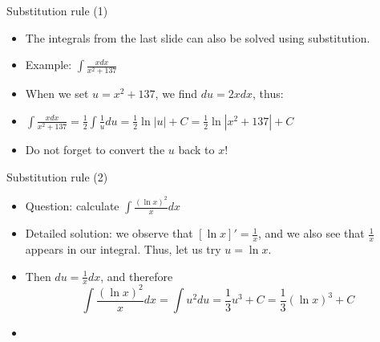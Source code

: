 \begin{frame}{Substitution rule (1)}
    \begin{itemize}
        \item The integrals from the last slide can also be solved using substitution.
        \item Example: $\int\frac{xdx}{x^2+137}$
        \pause\item When we set $u=x^2+137$, we find $du=2xdx$, thus:
        \pause\item $\int\frac{xdx}{x^2+137}=\frac{1}{2}\int\frac{1}{u}du=\frac{1}{2}\ln|u|+C=\frac{1}{2}\ln|x^2+137|+C$
        \pause\item Do not forget to convert the $u$ back to $x$!        
    \end{itemize}
\end{frame}

\begin{frame}{Substitution rule (2) }
    \begin{itemize}
        \item Question: calculate $\int\frac{(\ln x)^2}{x}dx$
        \item\pause Detailed solution: we observe that $[\ln x]'=\frac{1}{x}$, and we also see that $\frac{1}{x}$ appears in our integral. Thus, let us try $u=\ln x$.
        \item\pause Then $du=\frac{1}{x}dx$, and therefore \[\int\frac{(\ln x)^2}{x}dx=\int u^2 du=\frac{1}{3}u^3+C = \boxed{\frac{1}{3}(\ln x)^3+C}\]
        \item{}
    \end{itemize}
\end{frame}

